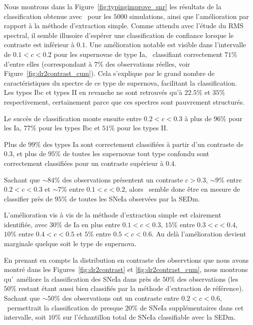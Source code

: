 \documentclass[../main/main.tex]{subfiles}
\begin{document}
Nous montrons dans la Figure~\ref{fig:typingimprove_snr} les résultats
de la classification obtenue avec \hypergal\ pour les $5000$
simulations, ainsi que l'amélioration par rapport à la méthode
d'extraction simple. Comme attendu avec l'étude du RMS spectral, il
semble illusoire d'espérer une classification de confiance lorsque le
contraste est inférieur à $0.1$. Une amélioration notable est visible dans
l'intervalle de $0.1<c<0.2$ pour les supernovae de type Ia,
\hypergal\ classifiant correctement $71\%$ d'entre elles (correspondant
à $7\%$ des observations réelles, voir Figure~\ref{fig:dr2contrast_cum}). Cela
s'explique par le grand nombre de caractéristiques du spectre de ce type
de supernova, facilitant la classification. Les types Ibc et types II en
revanche ne sont retrouvés qu'à $22.5\%$ et $35\%$ respectivement, certainement parce que
ces spectres sont pauvrement structurés. 

Le succès de classification monte ensuite entre $0.2<c<0.3$ à plus de
$96\%$ pour les Ia, $77\%$ pour les types  Ibc et $51\%$ pour les types II.

Plus de $99\%$ des types Ia sont correctement classifiées à partir d'un
contraste de $0.3$, et plus de $95\%$ de toutes les supernovae tout type
confondu sont
correctement classifiées pour un contraste supérieur à $0.4$.

Sachant que $\sim84\%$ des observations présentent un contraste $c>0.3$,
$\sim9\%$ entre $0.2<c<0.3$ et $\sim7\%$ entre $0.1<c<0.2$, alors \hypergal\ semble donc être en mesure de classifier près de $95\%$ de
toutes les SNeIa observées par la SEDm.

L'amélioration vis à vis de la méthode d'extraction simple est
clairement identifiée, avec $30\%$ de Ia en plus entre $0.1<c<0.3$,
$15\%$ entre $0.3<c<0.4$, $10\%$ entre $0.4<c<0.5$ et
$5\%$ entre $0.5<c<0.6$. Au delà l'amélioration devient marginale quelque
soit le type de supernova.

En prenant en compte la distribution en contraste des observtions que
nous avons montré dans les Figures~\ref{fig:dr2contrast} et
\ref{fig:dr2contrast_cum}, nous montrons qu'\hypergal\ améliore la
classification des SNeIa dans près de $50\%$ des observations (les
$50\%$ restant étant aussi bien classifiés par la méthode d'extraction
de référence). Sachant que $\sim50\%$ des observations ont un contraste
entre $0.2<c<0.6$, \hypergal\ permettrait la classification de presque
$20\%$ de SNeIa supplémentaires dans cet intervalle, soit $10\%$ sur
l'échantillon total de SNeIa classifiable avec la SEDm.
\end{document}
